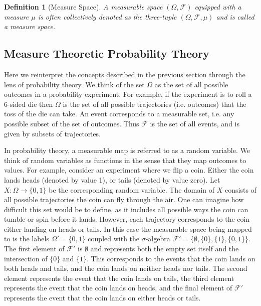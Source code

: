 \documentclass[10pt, oneside]{article}
\newtheorem{defn}{Definition}
\begin{document}
\begin{defn}[Measure Space]
    \label{defn:measure-space}
    A measurable space $(\Omega,\mathcal{F})$ equipped with a measure $\mu$ is often 
    collectively denoted as the three-tuple $(\Omega,\mathcal{F},\mu)$ and is called 
    a measure space. 
\end{defn}

\subsection{Measure Theoretic Probability Theory}

Here we reinterpret the concepts described in the previous section through the lens of probability theory.
We think of the set $\Omega$ as the set of all possible outcomes in a probability experiment. For example, if the experiment is to roll a 6-sided die then $\Omega$ is the set of all possible trajectories (i.e. outcomes) that the toss of the die can take.
An event corresponds to a measurable set, i.e. any possible subset of the set of outcomes.
Thus $\mathcal{F}$ is the set of all events, and is given by subsets of trajectories.

In probability theory, a measurable map is referred to as a random variable.
We think of random variables as functions in the sense that they map outcomes to values.
For example, consider an experiment where we flip a coin. 
Either the coin lands heads (denoted by value 1), or tails (denoted by value zero). 
Let $X:\Omega\to\{0,1\}$ be the corresponding random variable.
The domain of $X$ consists of all possible trajectories the coin can fly through the air. One can imagine how difficult this set would be to define, as it includes all possible ways the coin can tumble or spin before it lands.
However, each trajectory corresponds to the coin either landing on heads or tails.
In this case the measurable space being mapped to is the labels $\Omega'=\{0,1\}$ coupled with the $\sigma$-algebra $\mathcal{F}'=\{\emptyset,\{0\},\{1\},\{0,1\}\}$.
The first element of $\mathcal{F}'$ is $\emptyset$ and represents both the empty set itself and the intersection of $\{0\}$ and $\{1\}$.
This corresponds to the events that the coin lands on both heads and tails, and the coin lands on neither heads nor tails.
The second element represents the event that the coin lands on tails, the third element represents the event that the coin lands on heads, and the final element of $\mathcal{F}'$ represents the event that the coin lands on either heads or tails.
\end{document}

